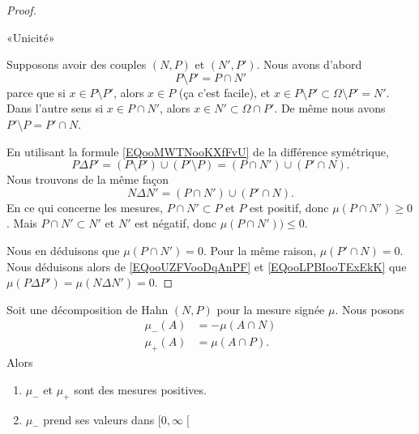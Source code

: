 \begin{proof}
	\begin{center}
		«Unicité»
	\end{center}

	Supposons avoir des couples \( (N,P)\) et \( (N',P')\). Nous avons d'abord
	\begin{equation}
		P\setminus P'=P\cap N'
	\end{equation}
	parce que si \( x\in P\setminus P'\), alors \( x\in P\) (ça c'est facile), et \( x\in P\setminus P'\subset \Omega\setminus P'=N'\). Dans l'autre sens si \( x\in P\cap N'\), alors \( x\in N'\subset\Omega\cap P'\). De même nous avons \( P'\setminus P=P'\cap N\).

	En utilisant la formule \eqref{EQooMWTNooKXfFvU} de la différence symétrique,
	\begin{equation}		\label{EQooUZFVooDqAnPF}
		P\Delta P'=(P\setminus P')\cup (P'\setminus P)=(P\cap N')\cup(P'\cap N).
	\end{equation}
	Nous trouvons de la même façon
	\begin{equation}		\label{EQooLPBIooTExEkK}
		N\Delta N'=(P\cap N')\cup(P'\cap N).
	\end{equation}
	En ce qui concerne les mesures, \( P\cap N'\subset P\) et \( P\) est positif, donc \(\mu(P\cap N')\geq 0 \). Mais \( P\cap N'\subset N'\) et \( N'\) est négatif, donc \( \mu(P\cap N'))\leq 0\).

	Nous en déduisons que \( \mu(P\cap N')=0\). Pour la même raison, \( \mu(P'\cap N)=0 \). Nous déduisons alors de \eqref{EQooUZFVooDqAnPF} et \eqref{EQooLPBIooTExEkK} que \( \mu(P\Delta P')=\mu(N\Delta N')=0\).
\end{proof}

\begin{lemma}
	Soit une décomposition de Hahn \( (N,P)\) pour la mesure signée \( \mu\).  Nous posons
	\begin{subequations}
		\begin{align}
			\mu_-(A) & =-\mu(A\cap N) \\
			\mu_+(A) & =\mu(A\cap P).
		\end{align}
	\end{subequations}
	Alors
	\begin{enumerate}
		\item
		      \( \mu_-\) et \( \mu_+\) sont des mesures positives.
		\item
		      \( \mu_-\) prend ses valeurs dans \( \mathopen[ 0,\infty\mathclose[\)
	\end{enumerate}
\end{lemma}

